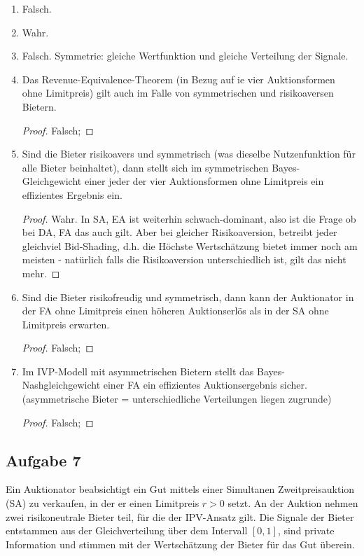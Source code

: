 \documentclass[12pt]{extreport} %
\theoremstyle{named}
\theoremstyle{nnamed}
\theoremstyle{itshape}
\theoremstyle{normal}
\begin{document}
\begin{enumerate}
		\begin{proof}
			Wahr; wenn wegen $r^{*} - x_{0}$ das Gut nicht verkauft wird, also wegen dem Zuschlag des Reservationspreises, ergibt sich ein ineffizientes Ergebnis.
		\end{proof}
	\item Falsch.
	\item Wahr.
	\item Falsch. Symmetrie: gleiche Wertfunktion und gleiche Verteilung der Signale.
	\item Das Revenue-Equivalence-Theorem (in Bezug auf ie vier Auktionsformen ohne Limitpreis) gilt auch im Falle von symmetrischen und risikoaversen Bietern.
		\begin{proof}
			Falsch;
		\end{proof}
	\item Sind die Bieter risikoavers und symmetrisch (was dieselbe Nutzenfunktion für alle Bieter beinhaltet), dann stellt sich im symmetrischen Bayes-Gleichgewicht einer jeder der vier Auktionsformen ohne Limitpreis ein effizientes Ergebnis ein.
		\begin{proof}
			 Wahr. In SA, EA ist weiterhin schwach-dominant, also ist die Frage ob bei DA, FA das auch gilt. Aber bei gleicher Risikoaversion, betreibt jeder gleichviel Bid-Shading, d.h. die Höchste Wertschätzung bietet immer noch am meisten - natürlich falls die Risikoaversion unterschiedlich ist, gilt das nicht mehr.
		\end{proof}
	\item Sind die Bieter risikofreudig und symmetrisch, dann kann der Auktionator in der FA ohne Limitpreis einen höheren Auktionserlös als in der SA ohne Limitpreis erwarten.
		\begin{proof}
			Falsch; 
		\end{proof}
	\item Im IVP-Modell mit asymmetrischen Bietern stellt das Bayes-Nashgleichgewicht einer FA ein effizientes Auktionsergebnis sicher. (asymmetrische Bieter = unterschiedliche Verteilungen liegen zugrunde)
		\begin{proof}
			Falsch;
		\end{proof}
\end{enumerate}

\subsection*{Aufgabe 7}

Ein Auktionator beabsichtigt ein Gut mittels einer Simultanen Zweitpreisauktion (SA) zu verkaufen, in der er einen Limitpreis $r > 0$ setzt. An der Auktion nehmen zwei risikoneutrale Bieter teil, für die der IPV-Ansatz gilt. Die Signale der Bieter entstammen aus der Gleichverteilung über dem Intervall $[0, 1]$, sind private Information und stimmen mit der Wertschätzung der Bieter für das Gut überein.
\end{document}
